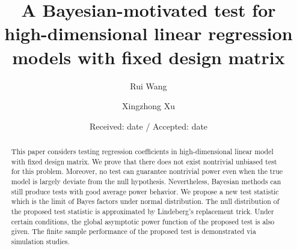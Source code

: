 \documentclass[smallextended]{svjour3}       %
\begin{document}
\title{
A Bayesian-motivated test for high-dimensional linear regression models with fixed design matrix
}


\author{ Rui Wang         \and
        Xingzhong Xu %
}



\date{Received: date / Accepted: date}


\maketitle

\begin{abstract}

This paper considers testing regression coefficients in high-dimensional linear model with fixed design matrix.
    We prove that there does not exist nontrivial unbiased test for this problem.
    Moreover, no test can guarantee nontrivial power even when the true model is largely deviate from the null hypothesis.
    Nevertheless, Bayesian methods can still produce tests with good average power behavior.
    We propose a new test statistic which is the limit of Bayes factors under normal distribution.
    The null distribution of the proposed test statistic is approximated by Lindeberg's replacement trick.
    Under certain conditions, the global asymptotic power function of the proposed test is also given.
    The finite sample performance of the proposed test is demonstrated via simulation studies.
\end{abstract}
\end{document}
